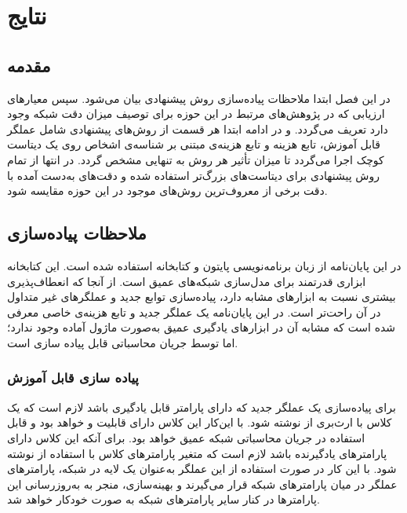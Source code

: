 \chapter{نتایج}
\label{chap:results}
\section{مقدمه} 
در این فصل ابتدا ملاحظات پیاده‌سازی روش پیشنهادی بیان می‌شود. سپس معیارهای ارزیابی که در پژوهش‌های مرتبط در این حوزه برای توصیف میزان دقت شبکه وجود دارد تعریف می‌گردد. و در ادامه ابتدا هر قسمت از روش‌های پیشنهادی شامل عملگر
قابل آموزش، تابع هزینه 
و تابع هزینه‌ی مبتنی بر شناسه‌ی اشخاص روی یک دیتاست کوچک اجرا می‌گردد تا میزان تأثیر هر روش به تنهایی مشخص گردد. در انتها از تمام روش پیشنهادی برای دیتاست‌های بزرگ‌تر استفاده شده و دقت‌های به‌دست آمده با دقت برخی از معروف‌ترین روش‌های موجود در این حوزه مقایسه شود.
\section{ملاحظات پیاده‌سازی}
در این پایان‌نامه از زبان برنامه‌نویسی پایتون و کتابخانه
  
 استفاده شده است. این کتابخانه ابزاری قدرتمند برای مدل‌سازی شبکه‌های عمیق است. از آنجا که  انعطاف‌پذیری بیشتری نسبت به ابزارهای مشابه دارد، پیاده‌سازی توابع جدید و عملگرهای غیر متداول در آن راحت‌تر است. در این پایان‌نامه یک عملگر جدید  و تابع هزینه‌ی خاصی معرفی شده است که مشابه آن در ابزارهای یادگیری عمیق به‌صورت ماژول آماده وجود ندارد؛ اما توسط جریان محاسباتی  قابل پیاده سازی است. 
\subsection{پیاده سازی  قابل آموزش}
برای پیاده‌سازی یک عملگر جدید که دارای پارامتر قابل یادگیری باشد لازم است که یک کلاس با ارث‌بری از  نوشته شود. با این‌کار این کلاس دارای قابلیت  و  خواهد بود و قابل استفاده در جریان محاسباتی شبکه عمیق خواهد بود.
برای آنکه این کلاس دارای پارامترهای یادگیرنده باشد لازم است که متغیر پارامترهای کلاس با استفاده از  نوشته شود. با این کار در صورت استفاده از این عملگر به‌عنوان یک لایه در شبکه، پارامترهای عملگر  در میان پارامترهای شبکه قرار می‌گیرند و بهینه‌سازی، منجر به به‌روزرسانی این پارامترها در کنار سایر پارامتر‌های شبکه به صورت خودکار خواهد شد.
